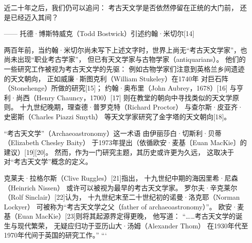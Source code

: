 近二十年之后，我们仍可以追问：  
考古天文学是否依然停留在正统的大门前，  
还是已经迈入其间？  

—— 托德·博斯特威克（Todd Bostwick）引述约翰·米切尔[14]

两百年前，当约翰·米切尔尚未写下上述文字时，世界上尚无“考古天文学家”，也尚未出现“职业考古学家”，  
但已有天文学家与古物学家（antiquarians）。  
他们的一些研究工作被视为考古天文学的先驱：  
例如古物学家们注意到英格兰乡间遗迹的天文朝向，  
正如威廉·斯图克利（William Stukeley）在1740年  
对巨石阵（Stonehenge）所做的研究[15]；  
约翰·奥布里（John Aubrey，1678）[16]  
与亨利·尚西（Henry Chauncy，1700）[17]  
则在教堂的朝向中寻找类似的天文学原则。  
十九世纪晚期，理查德·普罗克特（Richard Proctor）  
与查尔斯·皮亚齐·史密斯（Charles Piazzi Smyth）  
等天文学家研究了金字塔的天文朝向[18]。

\bigskip
“考古天文学”（Archaeoastronomy）这一术语  
由伊丽莎白·切斯利·贝蒂（Elizabeth Chesley Baity）  
于1973年提出（依循欧安·麦基〔Euan MacKie〕的建议）[19][20]。  
然而，作为一门研究主题，其历史或许更为久远，  
这取决于对“考古天文学”概念的定义。  

克莱夫·拉格尔斯（Clive Ruggles）[21]指出，  
十九世纪中期的海因里希·尼森（Heinrich Nissen）  
或许可以被视为最早的考古天文学家。  
罗尔夫·辛克莱尔（Rolf Sinclair）[22]认为，  
十九世纪末至二十世纪初的诺曼·洛克耶（Norman Lockyer）  
可被称为“考古天文学之父（father of archaeoastronomy）”。  
欧安·麦基（Euan MacKie）[23]则将其起源界定得更晚，  
他写道：  
“……考古天文学的诞生与现代繁荣，  
无疑应归功于亚历山大·汤姆（Alexander Thom）  
在1930年代至1970年代间于英国的研究工作。”
```
